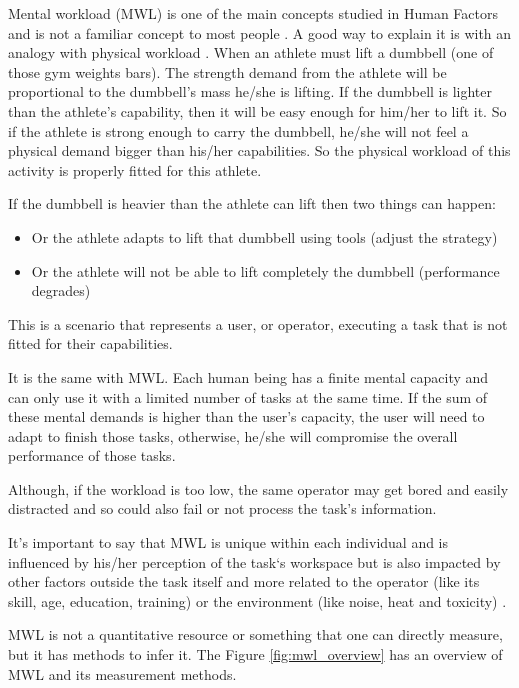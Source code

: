 Mental workload (MWL) is one of the main concepts studied in Human Factors and is not a familiar concept to most people \cite{stanton2004handbook}. A good way to explain it is with an analogy with physical workload \cite{stanton2004handbook}. When an athlete must lift a dumbbell (one of those gym weights bars). The strength demand from the athlete will be proportional to the dumbbell's mass he/she is lifting. If the dumbbell is lighter than the athlete's capability, then it will be easy enough for him/her to lift it. So if the athlete is strong enough to carry the dumbbell, he/she will not feel a physical demand bigger than his/her capabilities. So the physical workload of this activity is properly fitted for this athlete.

If the dumbbell is heavier than the athlete can lift then two things can happen:
\begin{itemize}
    \item Or the athlete adapts to lift that dumbbell using tools (adjust the strategy)
    \item Or the athlete will not be able to lift completely the dumbbell (performance degrades)
\end{itemize}

This is a scenario that represents a user, or operator, executing a task that is not fitted for their capabilities.

It is the same with MWL. Each human being has a finite mental capacity and can only use it with a limited number of tasks at the same time. If the sum of these mental demands is higher than the user's capacity, the user will need to adapt to finish those tasks, otherwise, he/she will compromise the overall performance of those tasks.

Although, if the workload is too low, the same operator may get bored and easily distracted and so could also fail or not process the task's information.  

It's important to say that MWL is unique within each individual and is influenced by his/her perception of the task`s workspace but is also impacted by other factors outside the task itself and more related to the operator (like its skill, age, education, training) or the environment (like noise, heat and toxicity) \cite{cain2007review, fallahi2016effects, cardoso2012evaluation}.

MWL is not a quantitative resource or something that one can directly measure, but it has methods to infer it. The Figure \ref{fig:mwl_overview} has an overview of MWL and its measurement methods.
        
